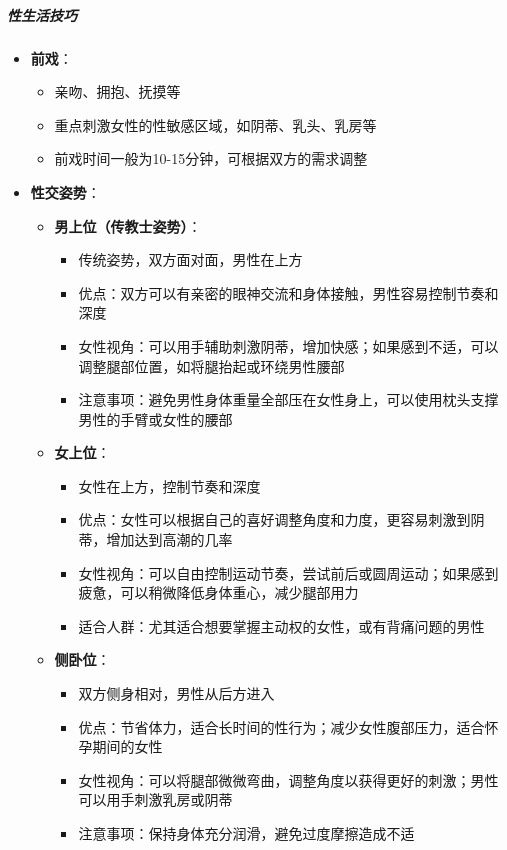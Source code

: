 \documentclass[12pt,UTF8]{ctexbook}
\begin{document}
\subparagraph{性生活技巧}

\begin{itemize}
\item \textbf{前戏}：
  \begin{itemize}
  \item 亲吻、拥抱、抚摸等
  \item 重点刺激女性的性敏感区域，如阴蒂、乳头、乳房等
  \item 前戏时间一般为10-15分钟，可根据双方的需求调整
  \end{itemize}
\item \textbf{性交姿势}：
  \begin{itemize}
  \item \textbf{男上位（传教士姿势）}：
    \begin{itemize}
    \item 传统姿势，双方面对面，男性在上方
    \item 优点：双方可以有亲密的眼神交流和身体接触，男性容易控制节奏和深度
    \item 女性视角：可以用手辅助刺激阴蒂，增加快感；如果感到不适，可以调整腿部位置，如将腿抬起或环绕男性腰部
    \item 注意事项：避免男性身体重量全部压在女性身上，可以使用枕头支撑男性的手臂或女性的腰部
    \end{itemize}
  \item \textbf{女上位}：
    \begin{itemize}
    \item 女性在上方，控制节奏和深度
    \item 优点：女性可以根据自己的喜好调整角度和力度，更容易刺激到阴蒂，增加达到高潮的几率
    \item 女性视角：可以自由控制运动节奏，尝试前后或圆周运动；如果感到疲惫，可以稍微降低身体重心，减少腿部用力
    \item 适合人群：尤其适合想要掌握主动权的女性，或有背痛问题的男性
    \end{itemize}
  \item \textbf{侧卧位}：
    \begin{itemize}
    \item 双方侧身相对，男性从后方进入
    \item 优点：节省体力，适合长时间的性行为；减少女性腹部压力，适合怀孕期间的女性
    \item 女性视角：可以将腿部微微弯曲，调整角度以获得更好的刺激；男性可以用手刺激乳房或阴蒂
    \item 注意事项：保持身体充分润滑，避免过度摩擦造成不适
    \end{itemize}

\end{itemize}
\end{itemize}
\end{document}
